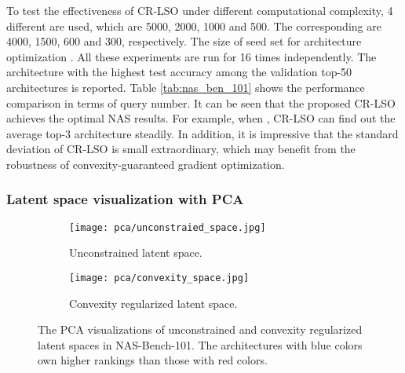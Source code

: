 \documentclass[10pt,twocolumn,letterpaper]{article}
\begin{document}
To test the effectiveness of CR-LSO under different computational complexity, 4 different  are used, which are 5000, 2000, 1000 and 500. The corresponding  are 4000, 1500, 600 and 300, respectively. The size of seed set for architecture optimization . All these experiments are run for 16 times independently. The architecture with the highest test accuracy among the validation top-50 architectures is reported. Table \ref{tab:nas_ben_101} shows the performance comparison in terms of query number. It can be seen that the proposed CR-LSO achieves the optimal NAS results. For example, when , CR-LSO can find out the average top-3 architecture steadily. In addition, it is impressive that the standard deviation of CR-LSO is small extraordinary, which may benefit from the robustness of convexity-guaranteed gradient optimization.
\subsubsection{Latent space visualization with PCA}
\begin{figure}
	\centering
	\begin{subfigure}{0.499 \linewidth}
		\texttt{[image: pca/unconstraied\_space.jpg]}
		\caption{Unconstrained latent space.}
		\label{fig:pca-a}
		\end{subfigure}
	\hfill
		\begin{subfigure}{0.48 \linewidth}
		\texttt{[image: pca/convexity\_space.jpg]}
		\caption{Convexity regularized latent space.}
		\label{fig:pca-b}
	\end{subfigure}
	\caption{The PCA visualizations of unconstrained and convexity regularized latent spaces in NAS-Bench-101. The architectures with blue colors own higher rankings than those with red colors.}
	\label{fig:pca}
\end{figure} 
\end{document}

